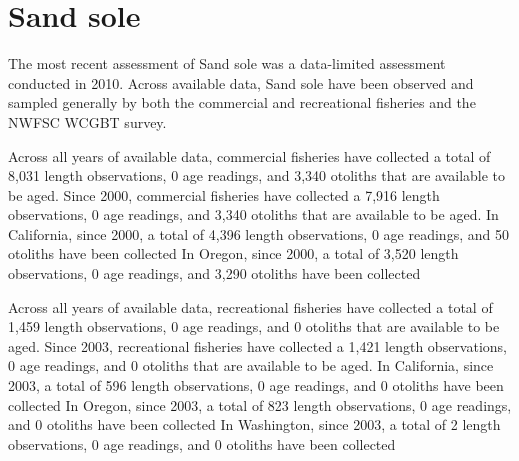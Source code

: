 \documentclass[11pt,
  english,
  letterpaper,
]{article}
\begin{document}
\leavevmode\tagmcend\tagstructend\par
\endgroup{}
\endgroup{}


\hypertarget{sand-sole}{%
\section{Sand sole}\label{sand-sole}}

\leavevmode\tagmcend\tagstructend


The most recent assessment of Sand sole was a data-limited assessment conducted in 2010. Across available data, Sand sole have been observed and sampled generally by both the commercial and recreational fisheries and the NWFSC WCGBT survey.

\leavevmode\tagmcend\tagstructend\par


Across all years of available data, commercial fisheries have collected a total of 8,031 length observations, 0 age readings, and 3,340 otoliths that are available to be aged. Since 2000, commercial fisheries have collected a 7,916 length observations, 0 age readings, and 3,340 otoliths that are available to be aged. In California, since 2000, a total of 4,396 length observations, 0 age readings, and 50 otoliths have been collected In Oregon, since 2000, a total of 3,520 length observations, 0 age readings, and 3,290 otoliths have been collected

\leavevmode\tagmcend\tagstructend\par


Across all years of available data, recreational fisheries have collected a total of 1,459 length observations, 0 age readings, and 0 otoliths that are available to be aged. Since 2003, recreational fisheries have collected a 1,421 length observations, 0 age readings, and 0 otoliths that are available to be aged. In California, since 2003, a total of 596 length observations, 0 age readings, and 0 otoliths have been collected In Oregon, since 2003, a total of 823 length observations, 0 age readings, and 0 otoliths have been collected In Washington, since 2003, a total of 2 length observations, 0 age readings, and 0 otoliths have been collected
\end{document}
